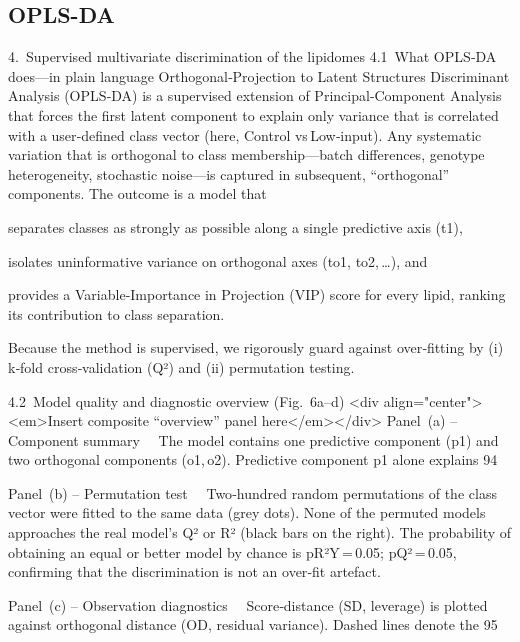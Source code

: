 \documentclass[10pt,letterpaper]{article}
\begin{document}
\subsection*{OPLS-DA}
4. Supervised multivariate discrimination of the lipidomes
4.1 What OPLS‑DA does—in plain language
Orthogonal‑Projection to Latent Structures Discriminant Analysis (OPLS‑DA) is a supervised extension of Principal‑Component Analysis that forces the first latent component to explain only variance that is correlated with a user‑defined class vector (here, Control vs Low‑input). Any systematic variation that is orthogonal to class membership—batch differences, genotype heterogeneity, stochastic noise—is captured in subsequent, “orthogonal” components.
The outcome is a model that

separates classes as strongly as possible along a single predictive axis (t1),

isolates uninformative variance on orthogonal axes (to1, to2, …), and

provides a Variable‑Importance in Projection (VIP) score for every lipid, ranking its contribution to class separation.

Because the method is supervised, we rigorously guard against over‑fitting by (i) k‑fold cross‑validation (Q²) and (ii) permutation testing.

4.2 Model quality and diagnostic overview (Fig. 6a–d)
<div align="center"><em>Insert composite “overview” panel here</em></div>
Panel (a) – Component summary 
The model contains one predictive component (p1) and two orthogonal components (o1, o2). Predictive component p1 alone explains 94 %

Panel (b) – Permutation test 
Two‑hundred random permutations of the class vector were fitted to the same data (grey dots). None of the permuted models approaches the real model’s Q² or R² (black bars on the right). The probability of obtaining an equal or better model by chance is pR²Y = 0.05; pQ² = 0.05, confirming that the discrimination is not an over‑fit artefact.

Panel (c) – Observation diagnostics 
Score‑distance (SD, leverage) is plotted against orthogonal distance (OD, residual variance). Dashed lines denote the 95 %
\end{document}
